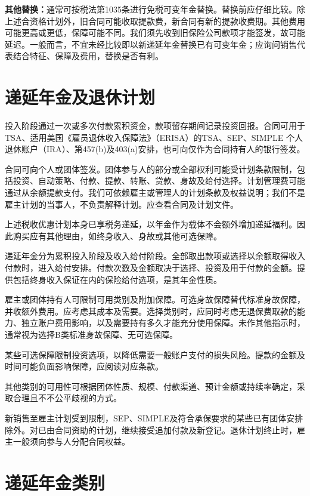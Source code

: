\documentclass[UTF8,fontset=none,11pt,a4paper]{ctexart}
\begin{document}
\textbf{其他替换：}通常可按税法第1035条进行免税可变年金替换。替换前应仔细比较。除上述合资格计划外，旧合同可能收取提款费，新合同有新的提款收费期。其他费用可能更高或更低，保障可能不同。我们须先收到旧保险公司款项才能签发，故可能延迟。一般而言，不宜未经比较即以新递延年金替换已有可变年金；应询问销售代表结合特征、保障及费用，替换\allowbreak\mbox{是否有利。}


\section*{递延年金及退休计划}
投入阶段通过一次或多次付款累积资金，款项留存期间记录投资回报。合同可用于TSA、适用美国《雇员退休收入保障法》（ERISA）的TSA、SEP、SIMPLE 个人退休账户（IRA）、第457(b)及403(a)安排，也可向仅作为合同持有人的银\allowbreak\mbox{行签发。}


合同可向个人或团体签发。团体参与人的部分或全部权利可能受计划条款限制，包括投资、自动策略、付款、提款、转账、贷款、身故及给付选择。计划管理费可能通过从余额提款支付。我们可依赖雇主或管理人的计划条款及权益说明；我们不是雇主计划的当事人，不负责解释计划。应查看合同及\allowbreak\mbox{计划文件。}


上述税收优惠计划本身已享税务递延，以年金作为载体不会额外增加递延福利。因此购买应有其他理由，如终身收入、身故或其他\allowbreak\mbox{可选保障。}


递延年金分为累积投入阶段及收入给付阶段。全部取出款项或选择以余额取得收入付款时，进入给付安排。付款次数及金额取决于选择、投资及用于付款的金额。提供包括终身收入保证在内的保险给付选项，是其\allowbreak\mbox{年金性质。}


雇主或团体持有人可限制可用类别及附加保障。可选身故保障替代标准身故保障，并收额外费用。应考虑其成本及需要。选择类别时，应同时考虑无退保费取款的能力、独立账户费用影响，以及需要持有多久才能充分使用保障。未作其他指示时，通常视为选择B类标准身故保障、无\allowbreak\mbox{可选保障。}


某些可选保障限制投资选项，以降低需要一般账户支付的损失风险。提款的金额及时间可能负面影响保障，应阅读\allowbreak\mbox{对应条款。}


其他类别的可用性可根据团体性质、规模、付款渠道、预计金额或持续率确定，采取合理且不不公平歧\allowbreak\mbox{视的方式。}


新销售至雇主计划受到限制，SEP、SIMPLE及符合承保要求的某些已有团体安排除外。对已由合同资助的计划，继续接受追加付款及新登记。退休计划终止时，雇主一般须向参与人分配\allowbreak\mbox{合同权益。}


\section*{递延年金类别}
\end{document}

